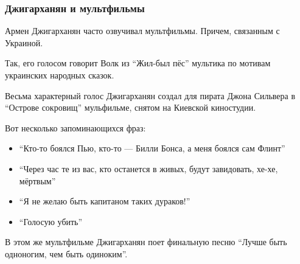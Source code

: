  
 
 

\subsubsection{Джигарханян и мультфильмы}
\label{sec:14_11_2020.news.ua.strana.1.deaths.armen_dzhiharnajan.multiki}

Армен Джигарханян часто озвучивал мультфильмы. Причем, связанным с
Украиной.

Так, его голосом говорит Волк из \enquote{Жил-был пёс} \dshM мультика по мотивам
украинских народных сказок. 

Весьма характерный голос Джигарханян создал для пирата Джона Сильвера в
\enquote{Острове сокровищ} \dshM мульфильме, снятом на Киевской киностудии. 

Вот несколько запоминающихся фраз:

\begin{itemize}
  \item \enquote{Кто-то боялся Пью, кто-то --- Билли Бонса, а меня боялся сам Флинт}
  \item \enquote{Через час те из вас, кто останется в живых, будут завидовать, хе-хе, мёртвым}
  \item \enquote{Я не желаю быть капитаном таких дураков!}
  \item \enquote{Голосую \dshM убить}
\end{itemize}

В этом же мультфильме Джигарханян поет финальную песню \dshM \enquote{Лучше быть
одноногим, чем быть одиноким}.

